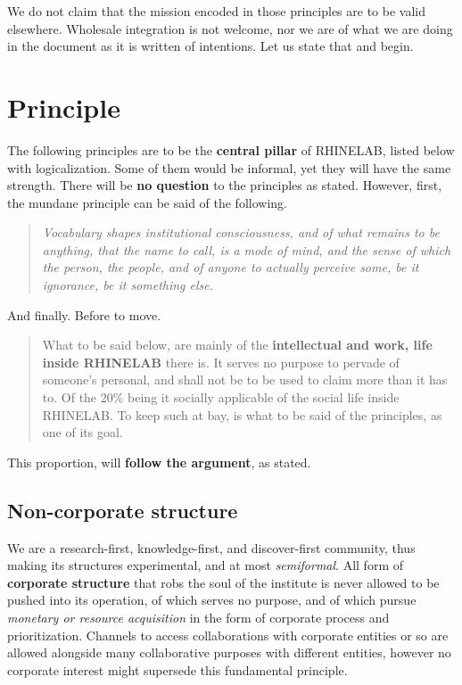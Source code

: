 \documentclass[10pt,a4paper]{article}
\begin{document}
We do not claim that the mission encoded in those principles are to be valid elsewhere. Wholesale integration is not welcome, nor we are of what we are doing in the document as it is written of intentions. Let us state that and begin. 

\section{Principle}

The following principles are to be the \textbf{central pillar} of RHINELAB, listed below with logicalization. Some of them would be informal, yet they will have the same strength. There will be \textbf{no question} to the principles as stated. However, first, the mundane principle can be said of the following. 

\begin{quote}
    \textit{Vocabulary shapes institutional consciousness, and of what remains to be anything, that the name to call, is a mode of mind, and the sense of which the person, the people, and of anyone to actually perceive some, be it ignorance, be it something else.}
\end{quote}

And finally. Before to move. 

\begin{quote}
    What to be said below, are mainly of the \textbf{intellectual and work, life inside RHINELAB} there is. It serves no purpose to pervade of someone's personal, and shall not be to be used to claim more than it has to. Of the 20\% being it socially applicable of the social life inside RHINELAB. To keep such at bay, is what to be said of the principles, as one of its goal.
\end{quote}

This proportion, will \textbf{follow the argument}, as stated. 

\subsection{Non-corporate structure}

We are a research-first, knowledge-first, and discover-first community, thus making its structures experimental, and at most \textit{semiformal}. All form of \textbf{corporate structure} that robs the soul of the institute is never allowed to be pushed into its operation, of which serves no purpose, and of which pursue \textit{monetary or resource acquisition} in the form of corporate process and prioritization. Channels to access collaborations with corporate entities or so are allowed alongside many collaborative purposes with different entities, however no corporate interest might supersede this fundamental principle. 
\end{document}

